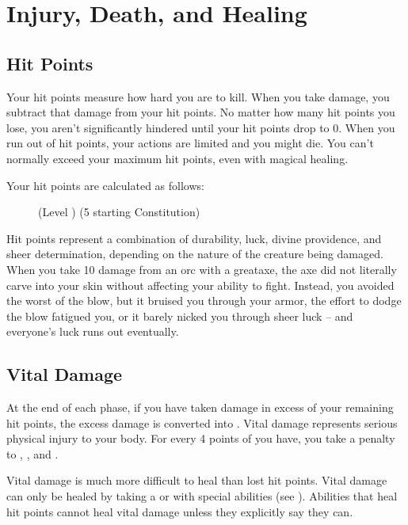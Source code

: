 \section{Injury, Death, and Healing}\label{Injury, Death, and Healing}

    \subsection{Hit Points}\label{Hit Points}
        Your hit points measure how hard you are to kill.
        When you take damage, you subtract that damage from your hit points.
        No matter how many hit points you lose, you aren't significantly hindered until your hit points drop to 0.
        When you run out of hit points, your actions are limited and you might die.
        You can't normally exceed your maximum hit points, even with magical healing.

        Your hit points are calculated as follows:

        \begin{figure}[h]
            \centering (Level ) \x (5 \add starting Constitution)
        \end{figure}

         Hit points represent a combination of durability, luck, divine providence, and sheer determination, depending on the nature of the creature being damaged.
        When you take 10 damage from an orc with a greataxe, the axe did not literally carve into your skin without affecting your ability to fight.
        Instead, you avoided the worst of the blow, but it bruised you through your armor, the effort to dodge the blow fatigued you, or it barely nicked you through sheer luck -- and everyone's luck runs out eventually.

    \subsection{Vital Damage}\label{Vital Damage}
        At the end of each phase, if you have taken damage in excess of your remaining hit points, the excess damage is converted into .
        Vital damage represents serious physical injury to your body.
        For every 4 points of  you have, you take a  penalty to , , and .

         Vital damage is much more difficult to heal than lost hit points.
        Vital damage can only be healed by taking a  or with special abilities (see ).
        Abilities that heal hit points cannot heal vital damage unless they explicitly say they can.

